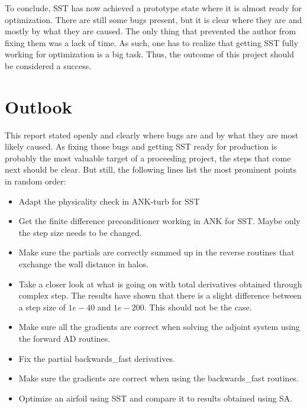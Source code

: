 To conclude, SST has now achieved a prototype state where it is almost ready
for optimization. There are still some bugs present, but it is clear where they
are and mostly by what they are caused. The only thing that prevented the
author from fixing them was a lack of time. As such, one has to realize that
getting SST fully working for optimization is a big task. Thus, the outcome of
this project should be considered a success.



\section{Outlook}
This report stated openly and clearly where bugs are and by what they are most
likely caused. As fixing those bugs and getting SST ready for production is
probably the most valuable target of a proceeding project, the steps that come
next should be clear. But still, the following lines list the most prominent
points in random order:

\begin{itemize}
    \item Adapt the physicality check in ANK-turb for SST

    \item Get the finite difference preconditioner working in ANK for SST.
        Maybe only the step size needs to be changed.

    \item Make sure the partials are correctly summed up in the reverse
        routines that exchange the wall distance in halos.

    \item Take a closer look at what is going on with total derivatives
        obtained through complex step. The results have shown that there is a
        slight difference between a step size of $1e-40$ and $1e-200$. This
        should not be the case.
        
    \item Make sure all the gradients are correct when solving the adjoint
        system using the forward AD routines.

    \item Fix the partial backwards\_fast derivatives.

    \item Make sure the gradients are correct when using the backwards\_fast
        routines.

    \item Optimize an airfoil using SST and compare it to results obtained
        using SA.
\end{itemize}

